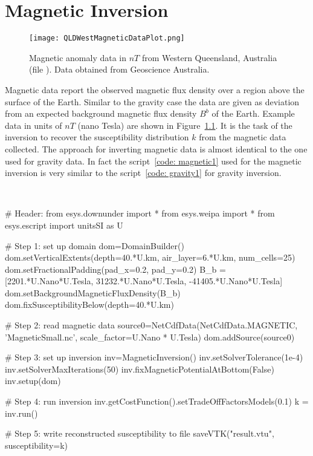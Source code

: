 \chapter{Magnetic Inversion}\label{Chp:cook:magnetic inversion}

\begin{figure}
\centering
\texttt{[image: QLDWestMagneticDataPlot.png]}
\caption{Magnetic anomaly data in $nT$ from Western Queensland, Australia
    (file ). Data obtained from Geoscience Australia.}
\label{FIG:P1:MAG:0}
\end{figure}

Magnetic data report the observed magnetic flux density over a region above the
surface of the Earth.
Similar to the gravity case the data are given as deviation from an expected
background magnetic flux density $B^b$ of the Earth.
Example data in units of $nT$ (nano Tesla) are shown in Figure~\ref{FIG:P1:MAG:0}.
It is the task of the inversion to recover the susceptibility distribution $k$
from the magnetic data collected. The approach for inverting magnetic data is
almost identical to the one used for gravity data. 
In fact the \downunder script~\ref{code: magnetic1} used for the magnetic
inversion is very similar to the script~\ref{code: gravity1} for gravity inversion.

\begin{pyc}\label{code: magnetic1}
\
\begin{python}
# Header:
from esys.downunder import *
from esys.weipa import *
from esys.escript import unitsSI as U


# Step 1: set up domain
dom=DomainBuilder()
dom.setVerticalExtents(depth=40.*U.km, air_layer=6.*U.km, num_cells=25)
dom.setFractionalPadding(pad_x=0.2, pad_y=0.2)
B_b = [2201.*U.Nano*U.Tesla,  31232.*U.Nano*U.Tesla, -41405.*U.Nano*U.Tesla]
dom.setBackgroundMagneticFluxDensity(B_b)
dom.fixSusceptibilityBelow(depth=40.*U.km)

# Step 2: read magnetic data
source0=NetCdfData(NetCdfData.MAGNETIC, 'MagneticSmall.nc', 
    scale_factor=U.Nano * U.Tesla)
dom.addSource(source0)

# Step 3: set up inversion
inv=MagneticInversion()
inv.setSolverTolerance(1e-4)
inv.setSolverMaxIterations(50)
inv.fixMagneticPotentialAtBottom(False)
inv.setup(dom)

# Step 4: run inversion 
inv.getCostFunction().setTradeOffFactorsModels(0.1) 
k = inv.run()

# Step 5: write reconstructed susceptibility to file
saveVTK("result.vtu", susceptibility=k)
\end{python}
\end{pyc}

